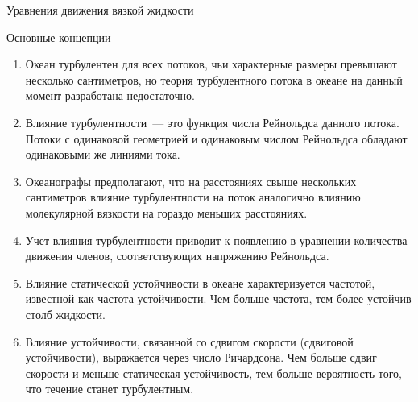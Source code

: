 \begin{chapter}{Уравнения движения вязкой жидкости}
\begin{section}{Основные концепции}
\begin{enumerate}
\item
Океан турбулентен для всех потоков, чьи характерные размеры превышают
несколько сантиметров, но теория турбулентного потока в океане на данный
момент разработана недостаточно.
%

\item
Влияние турбулентности~--- это 
функция числа Рейнольдса данного потока. Потоки с одинаковой геометрией 
и одинаковым числом Рейнольдса обладают одинаковыми же линиями тока. 
%

\item
Океанографы предполагают, что на расстояниях свыше нескольких сантиметров
влияние турбулентности на поток аналогично влиянию молекулярной вязкости
на гораздо меньших расстояниях.

\item
Учет влияния турбулентности приводит к появлению в уравнении количества 
движения членов, соответствующих напряжению Рейнольдса.
%

\item
Влияние статической устойчивости в океане характеризуется частотой,
известной как частота устойчивости. Чем больше частота, тем более устойчив 
столб жидкости.
%

\item
Влияние устойчивости, связанной со сдвигом скорости (сдвиговой
устойчивости), выражается через число Ричардсона. Чем больше сдвиг
скорости и меньше статическая устойчивость, тем больше вероятность
того, что течение станет турбулентным.
%


\end{enumerate}
\end{section}
\end{chapter}

